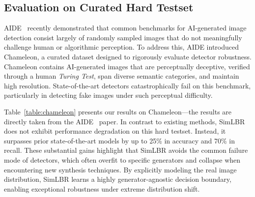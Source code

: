 \begin{table}
\caption{\textbf{Worst Case Performance Estimates: }This table shows the lowest performance of a detector across all testset generators. This metric serves as an upper bound for the worst-case performance of a detector. SimLBR shows the best worst-case estimate across both AIGC and GenImage generators, suggesting it is more dependable when deployed in real-world settings.}
\label{table:worst}
\end{table}


\subsection{Evaluation on Curated Hard Testset}
AIDE~\cite{yansanity} recently demonstrated that common benchmarks for AI-generated image detection consist largely of randomly sampled images that do not meaningfully challenge human or algorithmic perception. To address this, AIDE introduced Chameleon, a curated dataset designed to rigorously evaluate detector robustness. Chameleon contains AI-generated images that are perceptually deceptive, verified through a human \textit{Turing Test}, span diverse semantic categories, and maintain high resolution. State-of-the-art detectors catastrophically fail on this benchmark, particularly in detecting fake images under such perceptual difficulty.

Table~\ref{table:chameleon} presents our results on Chameleon—the results are directly taken from the AIDE~\cite{yansanity} paper. In contrast to existing methods, SimLBR does not exhibit performance degradation on this hard testset. Instead, it surpasses prior state-of-the-art models by up to 25\% in accuracy and 70\% in recall. These substantial gains highlight that SimLBR avoids the common failure mode of detectors, which often overfit to specific generators and collapse when encountering new synthesis techniques. By explicitly modeling the real image distribution, SimLBR learns a highly generator-agnostic decision boundary, enabling exceptional robustness under extreme distribution shift.



